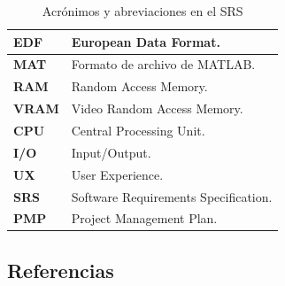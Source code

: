 \documentclass[12pt, letterpaper]{article}
\begin{document}
\begin{table}[ht]
\begin{tabular}{|p{4cm}|p{10cm}|}
\textbf{EDF} & European Data Format. \\ \hline

\textbf{MAT} & Formato de archivo de MATLAB. \\ \hline

\textbf{RAM} & Random Access Memory. \\ \hline

\textbf{VRAM} & Video Random Access Memory. \\ \hline

\textbf{CPU} & Central Processing Unit. \\ \hline

\textbf{I/O} & Input/Output. \\ \hline

\textbf{UX} & User Experience. \\ \hline

\textbf{SRS} & Software Requirements Specification. \\ \hline

\textbf{PMP} & Project Management Plan. \\ \hline

\end{tabular}

\caption{Acrónimos y abreviaciones en el SRS}

\end{table}

\newpage

\subsection{Referencias}

\renewcommand{\refname}{}

\renewcommand{\refname}{\vspace{-2 em}} 
\end{document}
